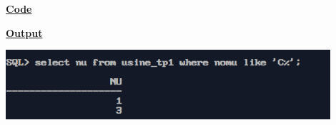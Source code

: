 \newpage
{}

\textbf{\underline{Code}}


\vspace{1cm}
\textbf{\underline{Output}}
\vspace{1cm}
\begin{center}
    \includegraphics[width=0.9\textwidth]{Questions/q13/q13.png}
\end{center}


